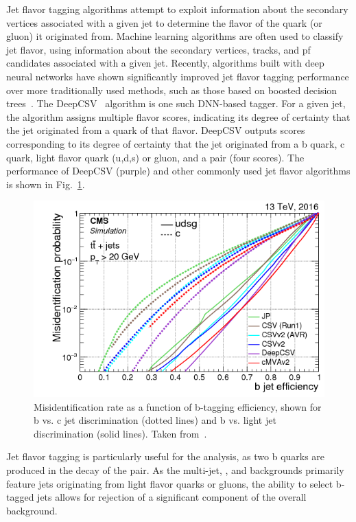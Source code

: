 Jet flavor tagging algorithms attempt to exploit information about the secondary vertices associated with a given jet to determine the flavor of the quark (or gluon) it originated from.
Machine learning algorithms are often used to classify jet flavor, using information about the secondary vertices, tracks, and pf candidates associated with a given jet.
Recently, algorithms built with deep neural networks have shown significantly improved jet flavor tagging performance over more traditionally used methods, such as those based on boosted decision trees~\cite{Guest_2016}.
The DeepCSV~\cite{Sirunyan_2018_deepcsv} algorithm is one such DNN-based tagger.
For a given jet, the algorithm assigns multiple flavor scores, indicating its degree of certainty that the jet originated from a quark of that flavor.
DeepCSV outputs scores corresponding to its degree of certainty that the jet originated from a b quark, c quark, light flavor quark (u,d,s) or gluon, and a \bb pair (four scores).
The performance of DeepCSV (purple) and other commonly used jet flavor algorithms is shown in Fig.~\ref{fig:evt_jet_btag}.
\begin{figure} [h!]
    \centering
    \includegraphics[width=\linewidth]{figures/event_reconstruction_and_selection/deepcsv_Figure_016.png}
    \caption{Misidentification rate as a function of b-tagging efficiency, shown for b vs. c jet discrimination (dotted lines) and b vs. light jet discrimination (solid lines). Taken from~\cite{Sirunyan_2018_deepcsv}.}
    \label{fig:evt_jet_btag}
\end{figure}

Jet flavor tagging is particularly useful for the \ttH analysis, as two b quarks are produced in the decay of the \ttb pair.
As the multi-jet, \gjets, and \dipho backgrounds primarily feature jets originating from light flavor quarks or gluons, the ability to select b-tagged jets allows for rejection of a significant component of the overall background.
